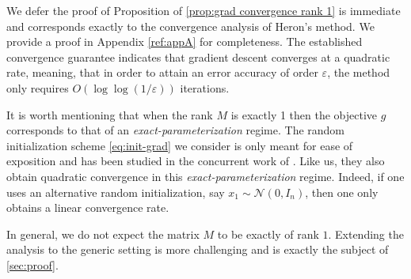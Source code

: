 We defer the proof of Proposition of \ref{prop:grad convergence rank 1} is immediate and corresponds exactly to the convergence analysis of Heron's method. We provide a proof in  Appendix \ref{ref:appA} for completeness. The established convergence guarantee indicates that gradient descent converges at a quadratic rate, meaning, that in order to attain an error accuracy of order $\varepsilon$, the method only requires $O(\log\log(1/\varepsilon))$ iterations.

It is worth mentioning that when the rank $M$ is exactly 1 then the objective $g$ corresponds to that of an \emph{exact-parameterization} regime. The random initialization scheme \eqref{eq:init-grad} we consider is only meant for ease of exposition and has been studied in the concurrent work of \cite{li2024crucial}. Like us, they also obtain quadratic convergence in this \emph{exact-parameterization} regime. Indeed, if one uses an alternative random initialization, say  $x_1 \sim \mathcal{N}(0, I_n)$, then one only obtains a linear convergence rate. 

In general, we do not expect the matrix $M$ to be exactly of rank $1$. Extending the analysis to the generic setting is more challenging and is exactly the subject of \textsection\ref{sec:proof}.


